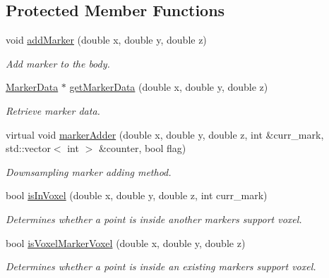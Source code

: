 \subsection*{Protected Member Functions}
\begin{DoxyCompactItemize}
\item 
void \hyperlink{class_body_aa965f7b498528230aa2f56a9abf6bf06}{add\+Marker} (double x, double y, double z)
\begin{DoxyCompactList}\small\item\em Add marker to the body. \end{DoxyCompactList}\item 
\hyperlink{class_marker_data}{Marker\+Data} $\ast$ \hyperlink{class_body_a530c704d7737af163c9ed06d42a373f0}{get\+Marker\+Data} (double x, double y, double z)
\begin{DoxyCompactList}\small\item\em Retrieve marker data. \end{DoxyCompactList}\item 
virtual void \hyperlink{class_body_a95f5997b4a076490aca4bc80dfce9eaf}{marker\+Adder} (double x, double y, double z, int \&curr\+\_\+mark, std\+::vector$<$ int $>$ \&counter, bool flag)
\begin{DoxyCompactList}\small\item\em Downsampling marker adding method. \end{DoxyCompactList}\item 
bool \hyperlink{class_body_aa7733bbcd85af5fa4e8822889fba7b33}{is\+In\+Voxel} (double x, double y, double z, int curr\+\_\+mark)
\begin{DoxyCompactList}\small\item\em Determines whether a point is inside another marker\textquotesingle{}s support voxel. \end{DoxyCompactList}\item 
bool \hyperlink{class_body_a3ed926c01461f32d64b4a5405e920e36}{is\+Voxel\+Marker\+Voxel} (double x, double y, double z)
\begin{DoxyCompactList}\small\item\em Determines whether a point is inside an existing marker\textquotesingle{}s support voxel. \end{DoxyCompactList}\end{DoxyCompactItemize}
